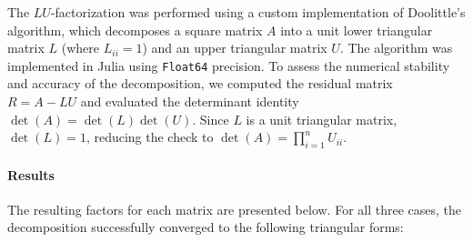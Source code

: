 \begin{solution}
  The $LU$-factorization was performed using a custom implementation of Doolittle's algorithm, which decomposes a square matrix $A$ into a unit lower triangular matrix $L$ (where $L_{ii} = 1$) and an upper triangular matrix $U$. The algorithm was implemented in Julia using \texttt{Float64} precision. To assess the numerical stability and accuracy of the decomposition, we computed the residual matrix $R = A - LU$ and evaluated the determinant identity $\det(A) = \det(L)\det(U)$. Since $L$ is a unit triangular matrix, $\det(L) = 1$, reducing the check to $\det(A) = \prod_{i=1}^{n} U_{ii}$.

  \paragraph{Results}
  The resulting factors for each matrix are presented below. For all three cases, the decomposition successfully converged to the following triangular forms:


\end{solution}
